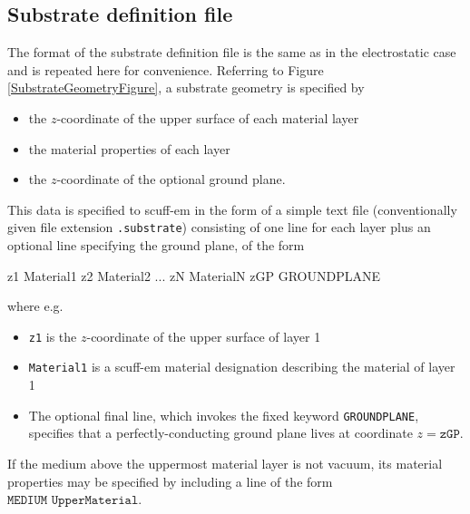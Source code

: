 \documentclass[letterpaper]{article}
\begin{document}
\subsection{Substrate definition file}

The format of the substrate definition file
is the same as in the electrostatic case
and is repeated here for convenience.
Referring to Figure \ref{SubstrateGeometryFigure},
a substrate geometry is specified by
\begin{itemize}
 \item the $z$-coordinate of the upper surface of each material layer
 \item the material properties of each layer
 \item the $z$-coordinate of the optional ground plane.
\end{itemize}

This data is specified to {\sc scuff-em} in the
form of a simple text file (conventionally given file
extension \texttt{.substrate}) consisting of one line for each
layer plus an optional line specifying the ground
plane, of the form

\medskip

\begin{verbcode}
z1  Material1
z2  Material2
...
zN  MaterialN
zGP GROUNDPLANE
\end{verbcode}

\medskip

where e.g.
\begin{itemize}
 \item \texttt{z1} is the $z$-coordinate of the upper surface of
       layer 1
 \item \texttt{Material1} is a {\sc scuff-em} material designation
       describing the material of layer 1
 \item The optional 
       final line, which invokes the fixed keyword \texttt{GROUNDPLANE},
       specifies that a perfectly-conducting ground plane lives at 
       coordinate $z=\texttt{zGP}$.
\end{itemize}
If the medium above the uppermost material layer is not vacuum,
its material properties may be specified by including a line of the form
$\texttt{MEDIUM UpperMaterial}.$
\end{document}
